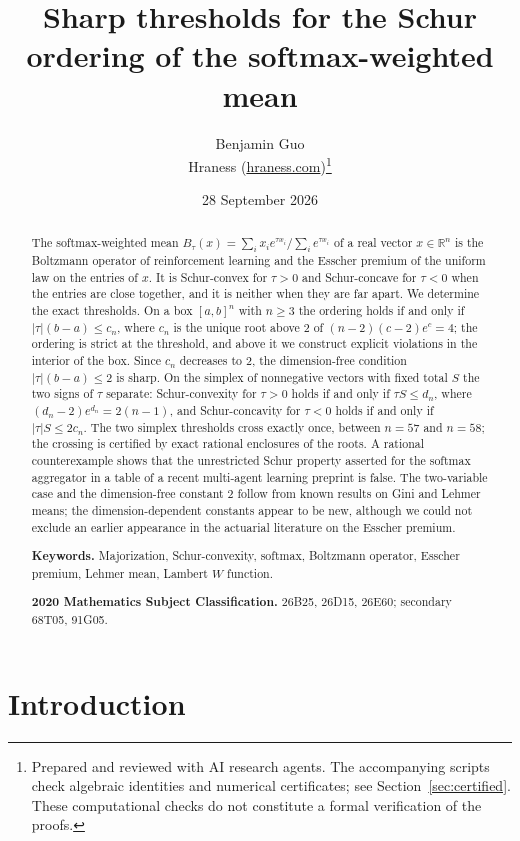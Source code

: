 \documentclass[11pt,a4paper]{article}
\title{Sharp thresholds for the Schur ordering of the softmax-weighted mean}
\author{Benjamin Guo\\ Hraness (\url{hraness.com})\thanks{Prepared and reviewed with AI research agents. The accompanying scripts check algebraic identities and numerical certificates; see Section~\ref{sec:certified}. These computational checks do not constitute a formal verification of the proofs.}}
\date{28 September 2026}
\theoremstyle{plain}
\theoremstyle{definition}
\newcommand{\R}{\mathbb{R}}
\begin{document}
\maketitle

\begin{abstract}
The softmax-weighted mean $B_\tau(x)=\sum_i x_i e^{\tau x_i}/\sum_i e^{\tau x_i}$ of a real vector $x\in\R^n$ is the Boltzmann operator of reinforcement learning and the Esscher premium of the uniform law on the entries of $x$. It is Schur-convex for $\tau>0$ and Schur-concave for $\tau<0$ when the entries are close together, and it is neither when they are far apart. We determine the exact thresholds. On a box $[a,b]^n$ with $n\ge 3$ the ordering holds if and only if $|\tau|(b-a)\le c_n$, where $c_n$ is the unique root above $2$ of $(n-2)(c-2)e^{c}=4$; the ordering is strict at the threshold, and above it we construct explicit violations in the interior of the box. Since $c_n$ decreases to $2$, the dimension-free condition $|\tau|(b-a)\le 2$ is sharp. On the simplex of nonnegative vectors with fixed total $S$ the two signs of $\tau$ separate: Schur-convexity for $\tau>0$ holds if and only if $\tau S\le d_n$, where $(d_n-2)e^{d_n}=2(n-1)$, and Schur-concavity for $\tau<0$ holds if and only if $|\tau|S\le 2c_n$. The two simplex thresholds cross exactly once, between $n=57$ and $n=58$; the crossing is certified by exact rational enclosures of the roots. A rational counterexample shows that the unrestricted Schur property asserted for the softmax aggregator in a table of a recent multi-agent learning preprint is false. The two-variable case and the dimension-free constant $2$ follow from known results on Gini and Lehmer means; the dimension-dependent constants appear to be new, although we could not exclude an earlier appearance in the actuarial literature on the Esscher premium.

\medskip\noindent\textbf{Keywords.} Majorization, Schur-convexity, softmax, Boltzmann operator, Esscher premium, Lehmer mean, Lambert $W$ function.

\smallskip\noindent\textbf{2020 Mathematics Subject Classification.} 26B25, 26D15, 26E60; secondary 68T05, 91G05.
\end{abstract}

\section{Introduction}\label{sec:intro}
\end{document}
